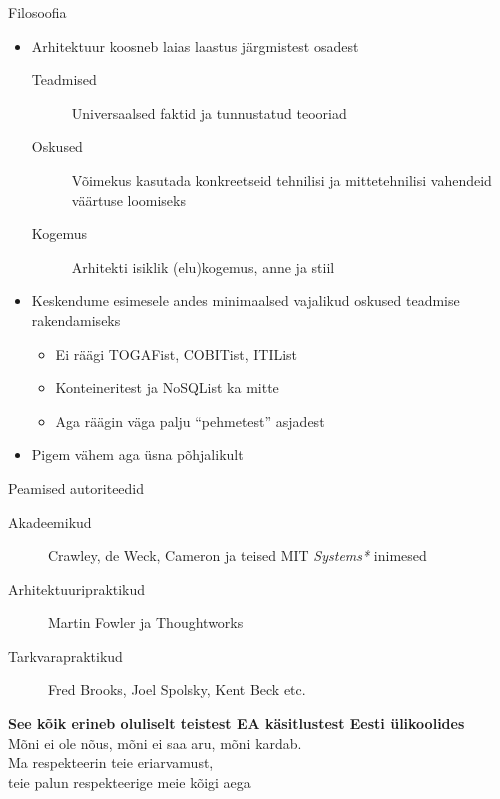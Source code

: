 \documentclass{beamer}
\begin{document}
\begin{frame}{Filosoofia}
	\begin{itemize}
		\item Arhitektuur koosneb laias laastus järgmistest osadest
		\begin{description}
			\item[Teadmised] Universaalsed  faktid ja tunnustatud teooriad
			\item[Oskused] Võimekus kasutada konkreetseid tehnilisi ja mittetehnilisi vahendeid väärtuse loomiseks 
			\item[Kogemus] Arhitekti isiklik (elu)kogemus, anne ja stiil
		\end{description}
		\item Keskendume esimesele andes minimaalsed vajalikud oskused teadmise rakendamiseks
		\begin{itemize}
			\item Ei räägi TOGAFist, COBITist, ITIList
			\item Konteineritest ja NoSQList ka mitte
			\item Aga räägin väga palju \enquote{pehmetest} asjadest
		\end{itemize}
		\item Pigem vähem aga üsna põhjalikult
	\end{itemize}
\end{frame}

\begin{frame}{Peamised autoriteedid}
	\begin{description}
		\item[Akadeemikud] Crawley, de Weck, Cameron ja teised MIT \emph{Systems*} inimesed
		\item[Arhitektuuripraktikud] Martin Fowler ja Thoughtworks
		\item[Tarkvarapraktikud] Fred Brooks, Joel Spolsky, Kent Beck etc.
\end{description}
\end{frame}

\begin{frame}[fragile]
	\begin{center}
		\LARGE{\textbf{See kõik erineb oluliselt teistest EA käsitlustest Eesti ülikoolides}}
		\\[4cm]
		\small{Mõni ei ole nõus, mõni ei saa aru, mõni kardab.\\ Ma respekteerin teie eriarvamust, \\teie palun respekteerige meie kõigi aega}
	\end{center}
\end{frame}
\end{document}
